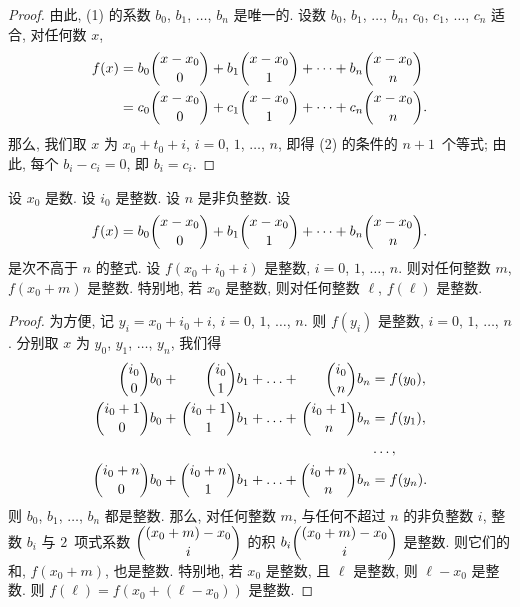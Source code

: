 \documentclass[../libro.tex]{subfiles}
\begin{document}
\begin{proof}
    由此, (1) 的系数 \(b_0\), \(b_1\), \(\dots\), \(b_n\) 是唯一的.
    设数 \(b_0\), \(b_1\), \(\dots\), \(b_n\),
    \(c_0\), \(c_1\), \(\dots\), \(c_n\) 适合,
    对任何数 \(x\),
    \begin{align*}
        f(x)
        = {} &
        b_0 \dbinom{x-x_0}{0}
        + b_1 \dbinom{x-x_0}{1} + \dots + b_n \dbinom{x-x_0}{n}
        \\
        = {} &
        c_0 \dbinom{x-x_0}{0}
        + c_1 \dbinom{x-x_0}{1} + \dots + c_n \dbinom{x-x_0}{n}.
    \end{align*}
    那么, 我们取 \(x\) 为 \(x_0 + t_0 + i\),
    \(i = 0\), \(1\), \(\dots\), \(n\),
    即得 (2) 的条件的 \(n + 1\)~个等式;
    由此, 每个 \(b_i - c_i = 0\),
    即 \(b_i = c_i\).
\end{proof}

\begin{theorem}
    设 \(x_0\) 是数.
    设 \(i_0\) 是整数.
    设 \(n\) 是非负整数.
    设
    \begin{align*}
        f(x) = b_0 \dbinom{x-x_0}{0}
        + b_1 \dbinom{x-x_0}{1} + \dots + b_n \dbinom{x-x_0}{n}.
    \end{align*}
    是次不高于 \(n\) 的整式.
    设 \(f(x_0 + i_0 + i)\) 是整数, \(i = 0\), \(1\), \(\dots\), \(n\).
    则对任何整数 \(m\),
    \(f(x_0 + m)\) 是整数.
    特别地, 若 \(x_0\) 是整数,
    则对任何整数 \(\ell\), \(f(\ell)\) 是整数.
\end{theorem}

\begin{proof}
    为方便, 记 \(y_i = x_0 + i_0 + i\), \(i = 0\), \(1\), \(\dots\), \(n\).
    则 \(f(y_i)\) 是整数, \(i = 0\), \(1\), \(\dots\), \(n\).
    分别取 \(x\) 为 \(y_0\), \(y_1\), \(\dots\), \(y_n\),
    我们得
    \begin{equation*}
        \begin{alignedat}{7}
            \dbinom{i_0}{0} b_0   & {} + {} & \dbinom{i_0}{1} b_1   & {} + {} & \dots & {} + {} & \dbinom{i_0}{n} b_n   & {} = f(y_0), \\
            \dbinom{i_0+1}{0} b_0 & {} + {} & \dbinom{i_0+1}{1} b_1 & {} + {} & \dots & {} + {} & \dbinom{i_0+1}{n} b_n & {} = f(y_1), \\
            {}                    &         &                       &         &       &         &                       & \dots,       \\
            \dbinom{i_0+n}{0} b_0 & {} + {} & \dbinom{i_0+n}{1} b_1 & {} + {} & \dots & {} + {} & \dbinom{i_0+n}{n} b_n & {} = f(y_n).
        \end{alignedat}
    \end{equation*}
    则 \(b_0\), \(b_1\), \(\dots\), \(b_n\) 都是整数.
    那么, 对任何整数 \(m\),
    与任何不超过 \(n\) 的非负整数 \(i\),
    整数 \(b_i\)
    与 \(2\)~项式系数 \(\dbinom{(x_0 + m) - x_0}{i}\)
    的积 \(b_i \dbinom{(x_0 + m) - x_0}{i}\) 是整数.
    则它们的和, \(f(x_0 + m)\), 也是整数.
    特别地, 若 \(x_0\) 是整数, 且 \(\ell\) 是整数,
    则 \(\ell - x_0\) 是整数.
    则 \(f(\ell) = f(x_0 + (\ell - x_0))\) 是整数.
\end{proof}
\end{document}
